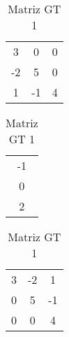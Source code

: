 \documentclass[12pt]{article}
\begin{document}
\begin{table}[!ht]
  \begin{minipage}[b]{.36\linewidth}

    \centering
    \begin{tabular}{|c c c|}
        3                 &         0                   &           0    \\
        -2          &         5                   &          0  \\
        1           &         -1           &          4    \\
    \end{tabular}
    \caption{Matriz G 1}
    \label{tab:dir}


  \end{minipage}\hfill
  \begin{minipage}[b]{.46\linewidth}

    \centering
    \begin{tabular}{|c|}
        -1\\
        0\\
        2\\
    \end{tabular}
    \caption{Resolução Matriz 1}
    \label{tab:dir}
  \end{minipage}\hfill
  \begin{minipage}[b]{.36\linewidth}

    \centering
    \begin{tabular}{|c c c|}
        3                 &         -2       &           1  \\
        0          &         5          &          -1       \\
        0           &         0               &          4  \\
    \end{tabular}
      \caption{Matriz GT 1}
    \label{tab:esq}
  \end{minipage}

\end{table}
\end{document}
